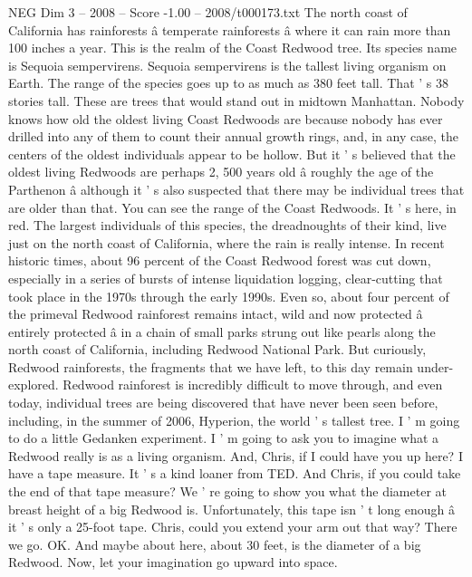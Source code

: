 \begin{textsample}{NEG Dim 3 – 2008 – Score -1.00 – 2008/t000173.txt}  \label{ex:f3_neg_021}
The north coast of California has rainforests â temperate rainforests â where it can rain more than 100 inches a year.
This is the realm of the Coast Redwood tree.
Its species name is Sequoia sempervirens.
Sequoia sempervirens is the tallest living organism on Earth.
The range of the species goes up to as much as 380 feet tall.
That ' s 38 stories tall.
These are trees that would stand out in midtown Manhattan.
Nobody knows how old the oldest living Coast Redwoods are because nobody has ever drilled into any of them to count their annual growth rings, and, in any case, the centers of the oldest individuals appear to be hollow.
But it ' s believed that the oldest living Redwoods are perhaps 2, 500 years old â roughly the age of the Parthenon â although it ' s also suspected that there may be individual trees that are older than that.
You can see the range of the Coast Redwoods.
It ' s here, in red.
The largest individuals of this species, the dreadnoughts of their kind, live just on the north coast of California, where the rain is really intense.
In recent historic times, about 96 percent of the Coast Redwood forest was cut down, especially in a series of bursts of intense liquidation logging, clear-cutting that took place in the 1970s through the early 1990s.
Even so, about four percent of the primeval Redwood rainforest remains intact, wild and now protected â entirely protected â in a chain of small parks strung out like pearls along the north coast of California, including Redwood National Park.
But curiously, Redwood rainforests, the fragments that we have left, to this day remain under- explored.
Redwood rainforest is incredibly difficult to move through, and even today, individual trees are being discovered that have never been seen before, including, in the summer of 2006, Hyperion, the world ' s tallest tree.
I ' m going to do a little Gedanken experiment.
I ' m going to ask you to imagine what a Redwood really is as a living organism.
And, Chris, if I could have you up here?
I have a tape measure.
It ' s a kind loaner from TED.
And Chris, if you could take the end of that tape measure?
We ' re going to show you what the diameter at breast height of a big Redwood is.
Unfortunately, this tape isn ' t long enough â it ' s only a 25-foot tape.
Chris, could you extend your arm out that way?
There we go.
OK.
And maybe about here, about 30 feet, is the diameter of a big Redwood.
Now, let your imagination go upward into space.

\end{textsample}
